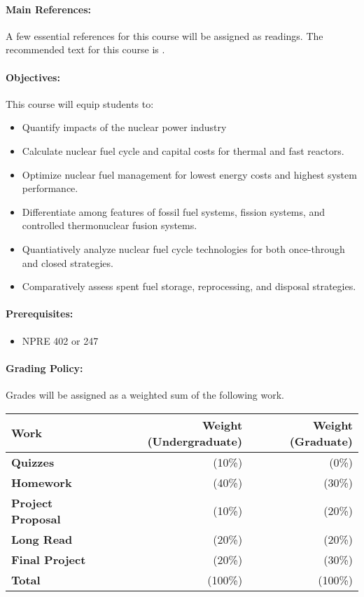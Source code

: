 \documentclass[11pt, a4paper]{article}
\begin{document}
\paragraph{Main References:}
A few essential references for this course will be assigned as readings. The 
recommended text for this course is \cite{tsoulfanidis_nuclear_2013}.

\renewcommand{\refname}{\normalfont\selectfont\normalsize}


\paragraph{Objectives:} 

This course will equip students to:

\begin{itemize}
\item Quantify impacts of the nuclear power industry
\item Calculate nuclear fuel cycle and capital costs for thermal and fast reactors.
\item Optimize nuclear fuel management for lowest energy costs and highest system performance.
\item Differentiate among features of fossil fuel systems, fission systems, and controlled thermonuclear fusion systems.
\item Quantiatively analyze nuclear fuel cycle technologies for both once-through and closed strategies.
\item Comparatively assess spent fuel storage, reprocessing, and disposal strategies.
\end{itemize}

\paragraph{Prerequisites:} 
\begin{itemize}
\item NPRE 402 or 247
\end{itemize}

\paragraph{Grading Policy:} Grades will be assigned as a weighted sum of the 
following work.

\begin{table}[h]
\begin{tabularx}{\textwidth}{Xrr}
        \textbf{Work} & \textbf{Weight (Undergraduate)} & \textbf{Weight (Graduate)} \\
\hline
\textbf{Quizzes}           & (10\%)   & (0\%)\\
\textbf{Homework}          & (40\%)   & (30\%)\\
\textbf{Project Proposal}  & (10\%)   & (20\%)\\
\textbf{Long Read}         & (20\%)   & (20\%)\\
\textbf{Final Project}     & (20\%)   & (30\%)\\
\hline
\textbf{Total}             & (100\%) & (100\%)\\
\end{tabularx}
\end{table}
\end{document}
